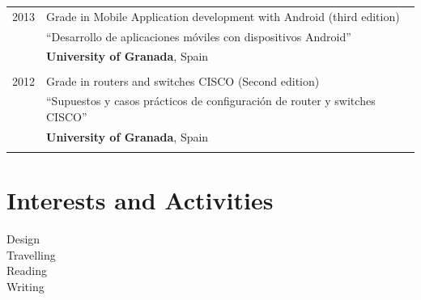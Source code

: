 \documentclass[a4paper,10pt]{article} %
\begin{document}
\begin{tabular}{rl}
\textsc{2013} & Grade in Mobile Application development with Android (third
edition) 
\\& ``Desarrollo de aplicaciones móviles con dispositivos Android''
\\& \normalsize\textbf{University of Granada}, Spain\\
&\\


\textsc{2012} & Grade in routers and switches CISCO (Second edition)
\\& ``Supuestos y casos prácticos de configuración de router y switches CISCO''
\\& \normalsize\textbf{University of Granada}, Spain\\
&\\


\end{tabular}




\section{Interests and Activities}

Design\\
Travelling\\
Reading\\
Writing\\
\end{document}
